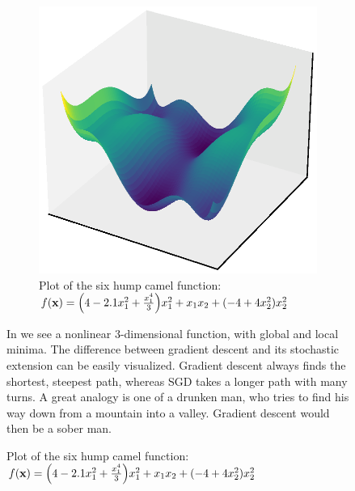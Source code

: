 \begin{figure}[H]
    \centering
    \begin{minipage}{0.45\textwidth}
        \centering
        \begin{figure}[H]
            \label{fig:six-hump-camel-function}
            \centering
            \includegraphics*[width=\textwidth]{./deep-learning/six-hump-camel-function-resized.eps}
            \caption{Plot of the six hump camel function: \( f(\mathbf{x}) = \Big( 4 - 2.1 x^{2}_{1} + \frac{x^{4}_{1}}{3} \Big) x^{2}_{1} + x_{1}x_{2} + (-4 + 4x^{2}_{2}) x^{2}_{2} \)}
        \end{figure}
    \end{minipage}\hfill
    \begin{minipage}{0.45\textwidth}        
        In  we see a nonlinear \(3\)-dimensional function, with global and local minima.
        The difference between gradient descent and its stochastic extension can be easily visualized.
        Gradient descent always finds the shortest, steepest path, whereas SGD takes a longer path with many turns.
        A great analogy is one of a drunken man, who tries to find his way down from a mountain into a valley.
        Gradient descent would then be a sober man.
    \end{minipage}
\end{figure}